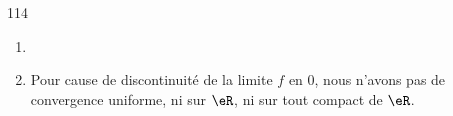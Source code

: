 

\begin{corrige}{114}


%

\begin{enumerate}
\item

%

\item Pour cause de discontinuité de la limite $f$ en $0$, nous n'avons pas de convergence uniforme, ni sur $\eR$, ni sur tout compact de $\eR$.
\end{enumerate}
\end{corrige}
